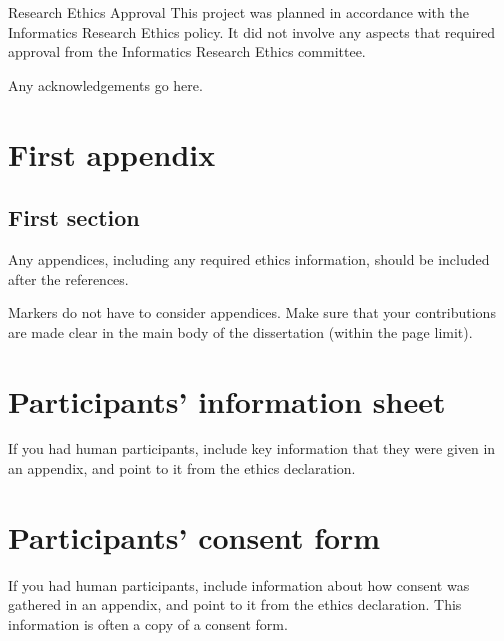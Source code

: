 \documentclass[logo,bsc,singlespacing,parskip]{infthesis}
\theoremstyle{definition}
\theoremstyle{example}
\theoremstyle{theorem}
\theoremstyle{theorem}
\theoremstyle{theorem}
\theoremstyle{theorem}
\theoremstyle{theorem}
\theoremstyle{definition}
\theoremstyle{definition}
\theoremstyle{definition}
\theoremstyle{definition}
\begin{document}
\begin{preliminary}
\newenvironment{ethics}
   {\begin{frontenv}{Research Ethics Approval}{\LARGE}}
   {\end{frontenv}\newpage}

\begin{ethics}
This project was planned in accordance with the Informatics Research
Ethics policy. It did not involve any aspects that required approval
from the Informatics Research Ethics committee.

\standarddeclaration
\end{ethics}


\begin{acknowledgements}
Any acknowledgements go here.
\end{acknowledgements}


\tableofcontents
\end{preliminary}










% 




\appendix

\chapter{First appendix}

\section{First section}

Any appendices, including any required ethics information, should be included
after the references.

Markers do not have to consider appendices. Make sure that your contributions
are made clear in the main body of the dissertation (within the page limit).

\chapter{Participants' information sheet}

If you had human participants, include key information that they were given in
an appendix, and point to it from the ethics declaration.

\chapter{Participants' consent form}

If you had human participants, include information about how consent was
gathered in an appendix, and point to it from the ethics declaration.
This information is often a copy of a consent form.
\end{document}
